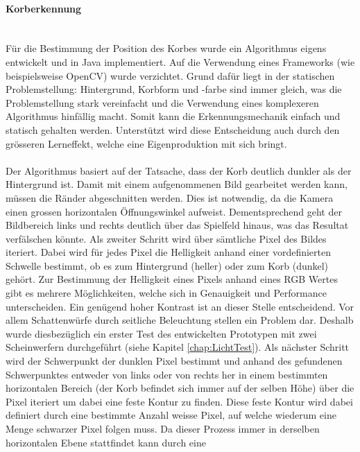 	\paragraph{Korberkennung}$~~$\vspace{2mm}\\
		Für die Bestimmung der Position des Korbes wurde ein Algorithmus 
		eigens entwickelt und in Java implementiert. Auf die Verwendung eines 
		Frameworks (wie beispielsweise OpenCV) wurde verzichtet. Grund dafür 
		liegt in der statischen Problemstellung: Hintergrund, Korbform und -farbe 
		sind immer gleich, was die Problemstellung stark vereinfacht und die Verwendung eines komplexeren Algorithmus hinfällig macht. Somit kann die Erkennungsmechanik einfach und statisch gehalten werden. Unterstützt wird diese Entscheidung auch durch den grösseren Lerneffekt, welche eine Eigenproduktion mit sich bringt. \\
		\\
		Der Algorithmus 
		basiert auf der Tatsache, dass der Korb deutlich dunkler als der 
		Hintergrund ist. Damit mit einem aufgenommenen Bild gearbeitet werden kann, 
		müssen die Ränder abgeschnitten werden. Dies ist notwendig, da die Kamera einen 
		grossen horizontalen Öffnungswinkel aufweist. Dementsprechend geht der 
		Bildbereich links und rechts deutlich über das Spielfeld 
		hinaus, was das Resultat verfälschen könnte. Als zweiter Schritt wird 
		über sämtliche Pixel des Bildes iteriert. Dabei wird für jedes Pixel die 
		Helligkeit anhand einer vordefinierten Schwelle bestimmt, ob es zum 
		Hintergrund (heller) oder zum Korb (dunkel) gehört. Zur Bestimmung der Helligkeit eines Pixels anhand eines RGB Wertes gibt es mehrere Möglichkeiten, welche sich in Genauigkeit und Performance unterscheiden. \cite{S:RGB} Ein genügend hoher 
		Kontrast ist an dieser Stelle entscheidend. Vor allem Schattenwürfe durch 
		seitliche Beleuchtung stellen ein Problem dar. Deshalb wurde diesbezüglich 
		ein erster Test des entwickelten Prototypen mit zwei Scheinwerfern 
		durchgeführt (siehe Kapitel \ref{chap:LichtTest}). Als nächster Schritt 
		wird der Schwerpunkt der dunklen Pixel bestimmt und anhand des gefundenen 
		Schwerpunktes entweder von links oder von rechts her in einem bestimmten 
		horizontalen Bereich (der Korb befindet sich immer auf der selben Höhe)
		über die Pixel iteriert um dabei eine feste Kontur zu finden. Diese feste 
		Kontur wird dabei definiert durch eine bestimmte Anzahl weisse Pixel, auf 
		welche wiederum eine Menge schwarzer Pixel folgen muss. Da dieser Prozess 
		immer in derselben horizontalen Ebene stattfindet kann durch eine 
